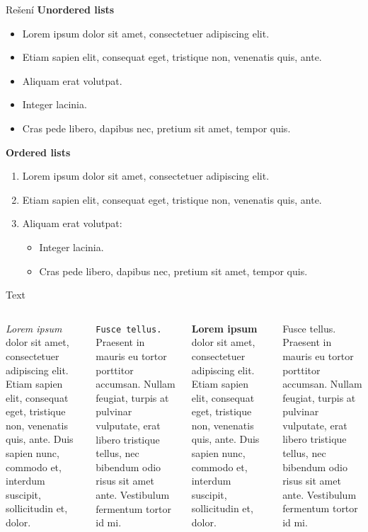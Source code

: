 \documentclass[aspectratio=1610]{beamer}
\begin{document}
\begin{frame}{Rešení}
    \textbf{Unordered lists}
    \begin{itemize}
        \item Lorem ipsum dolor sit amet, consectetuer adipiscing elit.
        \item Etiam sapien elit, consequat eget, tristique non, venenatis quis, ante.
        \item Aliquam erat volutpat.
        \item Integer lacinia.
        \item Cras pede libero, dapibus nec, pretium sit amet, tempor quis.
    \end{itemize}
    \bigskip %

    \textbf{Ordered lists}
    \begin{enumerate}
        \item \alert{Lorem ipsum dolor} sit amet, consectetuer adipiscing elit.
        \item Etiam sapien elit, consequat eget, tristique non, venenatis quis, ante.
        \item Aliquam erat volutpat:
        \begin{itemize}
            \item Integer lacinia.
            \item Cras pede libero, dapibus nec, pretium sit amet, tempor quis.
        \end{itemize}
    \end{enumerate}
\end{frame}

\begin{frame}{Text}
    \begin{columns}
        \textit{Lorem ipsum} dolor sit amet, consectetuer adipiscing elit. Etiam sapien elit, consequat eget, tristique non, venenatis quis, ante. Duis sapien nunc, commodo et, interdum suscipit, sollicitudin et, dolor.
        \bigskip
        
        \texttt{Fusce tellus.} Praesent in mauris eu tortor porttitor accumsan. Nullam feugiat, turpis at pulvinar vulputate, erat libero tristique tellus, nec bibendum odio risus sit amet ante. Vestibulum fermentum tortor id mi.

        \textbf{Lorem ipsum} dolor sit amet, consectetuer adipiscing elit. Etiam sapien elit, consequat eget, tristique non, venenatis quis, ante. Duis sapien nunc, commodo et, interdum suscipit, sollicitudin et, dolor.
        \bigskip
        
        Fusce tellus. Praesent in mauris eu tortor porttitor accumsan. Nullam feugiat, turpis at pulvinar vulputate, erat libero tristique tellus, nec bibendum odio risus sit amet ante. Vestibulum fermentum tortor id mi.
    \end{columns}
\end{frame}
\end{document}
